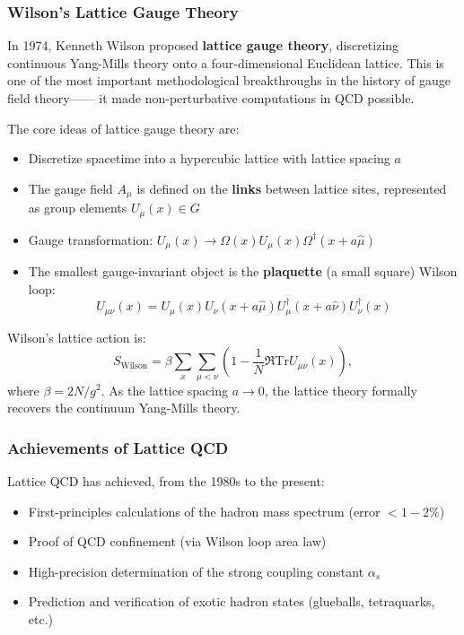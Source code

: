 \documentclass[12pt,a4paper]{article}
\theoremstyle{remark}
\newcommand{\Tr}{\mathrm{Tr}}
\begin{document}
\subsubsection{Wilson's Lattice Gauge Theory}

In 1974, Kenneth Wilson proposed \textbf{lattice gauge theory}, discretizing
continuous Yang-Mills theory onto a four-dimensional Euclidean lattice. This is one of the most important methodological breakthroughs in the history of gauge field theory——
it made non-perturbative computations in QCD possible.

The core ideas of lattice gauge theory are:
\begin{itemize}
    \item Discretize spacetime into a hypercubic lattice with lattice spacing $a$
    \item The gauge field $A_\mu$ is defined on the \textbf{links} between lattice sites, represented as group elements $U_\mu(x) \in G$
    \item Gauge transformation: $U_\mu(x) \to \Omega(x) U_\mu(x) \Omega^\dagger(x + a\hat{\mu})$
    \item The smallest gauge-invariant object is the \textbf{plaquette} (a small square) Wilson loop:
    \begin{equation}
        U_{\mu\nu}(x) = U_\mu(x) U_\nu(x + a\hat{\mu})
        U_\mu^\dagger(x + a\hat{\nu}) U_\nu^\dagger(x)
    \end{equation}
\end{itemize}

Wilson's lattice action is:
\begin{equation}
    S_{\text{Wilson}} = \beta \sum_{x} \sum_{\mu < \nu}
    \left(1 - \frac{1}{N}\Re\Tr U_{\mu\nu}(x)\right),
\end{equation}
where $\beta = 2N/g^2$. As the lattice spacing $a \to 0$, the lattice theory formally recovers
the continuum Yang-Mills theory.

\subsubsection{Achievements of Lattice QCD}

Lattice QCD has achieved, from the 1980s to the present:
\begin{itemize}
    \item First-principles calculations of the hadron mass spectrum (error $< 1-2\%$)
    \item Proof of QCD confinement (via Wilson loop area law)
    \item High-precision determination of the strong coupling constant $\alpha_s$
    \item Prediction and verification of exotic hadron states (glueballs, tetraquarks, etc.)
\end{itemize}
\end{document}

